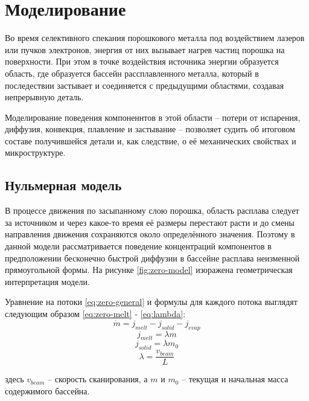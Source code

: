 \section{Моделирование}

Во время селективного спекания порошкового металла под воздействием лазеров или пучков электронов, энергия от них вызывает нагрев частиц порошка на поверхности. 
При этом в точке воздействия источника энергии образуется область, где образуется бассейн рассплавленного металла, который в последествии застывает и соединяется с предыдущими областями, создавая непрерывную деталь.

Моделирование поведения компоненнтов в этой области -- потери от испарения, диффузия, конвекция, плавление и застывание -- позволяет судить об итоговом составе получившейся детали и, как следствие, о её механических свойствах и микроструктуре.

\subsection{Нульмерная модель}

В процессе движения по засыпанному слою порошка, область расплава следует за источником и через какое-то время её размеры перестают расти и до смены направления движения сохраняются около определённого значения. 
Поэтому в данной модели рассматривается поведение концентраций компонентов в предположении бесконечно быстрой диффузии в бассейне расплава неизменной 
прямоугольной формы. На рисунке \ref{fig:zero-model} изоражена геометрическая интерпретация модели.

Уравнение на потоки \ref{eq:zero-general} и формулы для каждого потока выглядят следующим образом \ref{eq:zero-melt} - \ref{eq:lambda}:
\begin{equation}
    \label{eq:zero-general}
    \dot{m} = j_{melt} - j_{solid} - j_{evap}
\end{equation}
\begin{equation}
    \label{eq:zero-melt}
    j_{melt} = \lambda m
\end{equation}
\begin{equation}
    \label{eq:zer-sol}
    j_{solid} = \lambda m_0
\end{equation}
\begin{equation}
    \label{eq:lambda}
    \lambda = \frac{v_{beam}}{L}
\end{equation}

\noindent
здесь $v_{beam}$ -- скорость сканирования, а $m$ и $m_0$ -- текущая и начальная масса содержимого бассейна.

